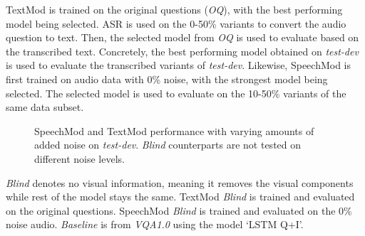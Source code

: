 \documentclass[letterpaper]{article} %
\begin{document}
TextMod is trained on the original questions (\textit{OQ}), with the best performing model being selected. ASR is used on the 0-50\% variants to convert the audio question to text. Then, the selected model from \textit{OQ} is used to evaluate based on the transcribed text. Concretely, the best performing model obtained on \textit{test-dev} is used to evaluate the transcribed variants of \textit{test-dev}.
Likewise, SpeechMod is first trained on audio data with 0\% noise, with the strongest model being selected. The selected model is used to evaluate on the 10-50\% variants of the same data subset.


\pgfplotsset{width=8cm,compat=1.9}
\begin{figure}[t]
\centering
{}
\caption{SpeechMod and TextMod performance with varying amounts of added noise on \textit{test-dev}. \textit{Blind} counterparts are not tested on different noise levels.}
\label{fig:noiseplots}
\end{figure}


\textit{Blind} denotes no visual information, meaning it removes the visual components while rest of the model stays the same. TextMod \textit{Blind} is trained and evaluated on the original questions. SpeechMod \textit{Blind} is trained and evaluated on the 0\% noise audio. \textit{Baseline} is from \textit{VQA1.0} using the model `LSTM Q+I'.
\end{document}
